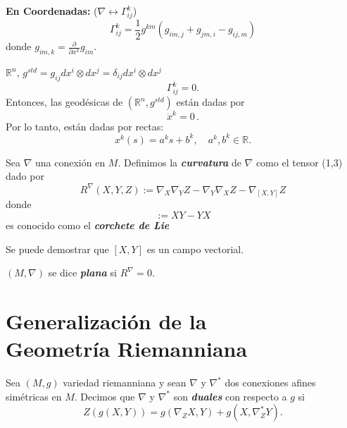 \noindent\textbf{En Coordenadas:} ($\nabla\leftrightarrow\Gamma_{ij}^k$)
\begin{equation*}
\Gamma_{ij}^k=\frac{1}{2}g^{km}(g_{im,j}+g_{jm,i}-g_{ij,m})
\end{equation*}
donde $g_{im,k}=\frac{\partial}{\partial x^k}g_{im}$.

\begin{example}
$\mathbb{R}^n$, $g^{std}=g_{ij}dx^i\otimes dx^j=\delta_{ij}dx^i\otimes dx^j$ 
\begin{equation*}
    \Gamma_{ij}^k=0.
\end{equation*}
Entonces, las geod\'esicas de $(\mathbb{R}^n,g^{std})$ est\'an dadas por
\begin{equation*}
    \ddot{x}^k =0\,. %
\end{equation*}
Por lo tanto, est\'an dadas por rectas:
\begin{equation*}
    x^k(s)=a^ks+b^k,\quad a^k,b^k\in\mathbb{R}.
\end{equation*}
\end{example}

\begin{definition}
Sea $\nabla$ una conexi\'on en $M$. Definimos la \textbf{\textit{curvatura}} de $\nabla$ como el tensor (1,3) dado por
\begin{equation*}
    R^{\nabla}(X,Y,Z):=\nabla_X\nabla_YZ-\nabla_Y\nabla_XZ-\nabla_{[X,Y]}Z
\end{equation*}
donde 
\begin{equation*}
    [X,Y]:=XY-YX
\end{equation*}
es conocido como el \textit{\textbf{corchete de Lie}}
\end{definition}

\begin{observation}
Se puede demostrar que $[X,Y]$ es un campo vectorial.     
\end{observation}

\begin{definition}
$(M,\nabla)$ se dice \textbf{\textit{plana}} si $R^\nabla=0$.    
\end{definition}

\section{Generalizaci\'on de la\\
Geometr\'ia Riemanniana}

\begin{definition}
Sea $(M,g)$ variedad riemanniana y sean $\nabla$ y $\nabla^*$ dos conexiones afines sim\'etricas en $M$. Decimos que $\nabla$ y $\nabla^*$ son \textit{\textbf{duales}} con respecto a $g$ si 
\begin{equation*}
    Z(g(X,Y))=g(\nabla_ZX,Y)+g(X,\nabla_Z^*Y).
\end{equation*}
\end{definition}

